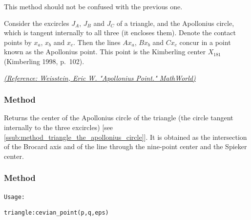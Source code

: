 This method should not be confused with the previous one.

Consider the excircles $J_A$, $J_B$ and $J_C$ of a triangle, and the Apollonius circle, which is tangent internally to all three (it encloses them). Denote the contact points by $x_a$, $x_b$ and $x_c$. Then the lines $Ax_a$, $Bx_b$ and $Cx_c$ concur in a point known as the Apollonius point. This point is the Kimberling center $X_{181}$ (Kimberling 1998, p.~102).

\begin{tkzexample}
\end{tkzexample}

\begin{flushright}
\small
\href{https://mathworld.wolfram.com/ApolloniusPoint.html}{\textit{(Reference: Weisstein, Eric W. "Apollonius Point." MathWorld)}}
\end{flushright}


\subsubsection{Method }
\label{ssub:method_triangle_the_apollonius_center}

Returns the center of the Apollonius circle of the triangle (the circle tangent
internally to the three excircles) [see \ref{ssub:method_triangle_the_apollonius_circle}].
It is obtained as the intersection of the Brocard axis and of the line through
the nine-point center and the Spieker center.

\begin{tkzexample}
\end{tkzexample}

\subsubsection{Method }
\label{ssub:cevian_point}

\texttt{Usage: }

\begin{verbatim}
triangle:cevian_point(p,q,eps)
\end{verbatim}

